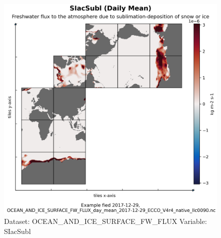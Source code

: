\begin{figure}[H]
\centering
\includegraphics[scale=0.55]{../images/plots/native_plots/Ocean_and_Sea-Ice_Surface_Freshwater_Fluxes/SIacSubl.png}
\caption{Dataset: OCEAN\_AND\_ICE\_SURFACE\_FW\_FLUX Variable: SIacSubl}
\label{tab:table-OCEAN_AND_ICE_SURFACE_FW_FLUX_SIacSubl-Plot}
\end{figure}
\pagebreak
